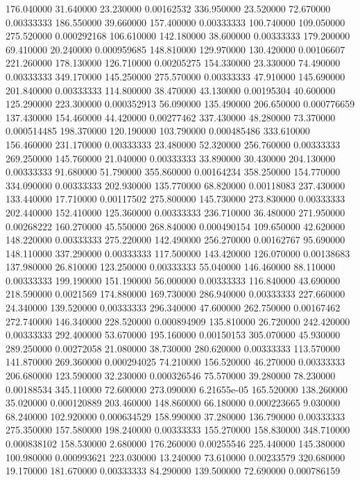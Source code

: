 176.040000	31.640000	23.230000	0.00162532
336.950000	23.520000	72.670000	0.00333333
186.550000	39.660000	157.400000	0.00333333
100.740000	109.050000	275.520000	0.000292168
106.610000	142.180000	38.600000	0.00333333
179.200000	69.410000	20.240000	0.000959685
148.810000	129.970000	130.420000	0.00106607
221.260000	178.130000	126.710000	0.00205275
154.330000	23.330000	74.490000	0.00333333
349.170000	145.250000	275.570000	0.00333333
47.910000	145.690000	201.840000	0.00333333
114.800000	38.470000	43.130000	0.00195304
40.600000	125.290000	223.300000	0.000352913
56.090000	135.490000	206.650000	0.000776659
137.430000	154.460000	44.420000	0.00277462
337.430000	48.280000	73.370000	0.000514485
198.370000	120.190000	103.790000	0.000485486
333.610000	156.460000	231.170000	0.00333333
23.480000	52.320000	256.760000	0.00333333
269.250000	145.760000	21.040000	0.00333333
33.890000	30.430000	204.130000	0.00333333
91.680000	51.790000	355.860000	0.00164234
358.250000	154.770000	334.090000	0.00333333
202.930000	135.770000	68.820000	0.00118083
237.430000	133.440000	17.710000	0.00117502
275.800000	145.730000	273.830000	0.00333333
202.440000	152.410000	125.360000	0.00333333
236.710000	36.480000	271.950000	0.00268222
160.270000	45.550000	268.840000	0.000490154
109.650000	42.620000	148.220000	0.00333333
275.220000	142.490000	256.270000	0.00162767
95.690000	148.110000	337.290000	0.00333333
117.500000	143.420000	126.070000	0.00138683
137.980000	26.810000	123.250000	0.00333333
55.040000	146.460000	88.110000	0.00333333
199.190000	151.190000	56.000000	0.00333333
116.840000	43.690000	218.590000	0.0021569
174.880000	169.730000	286.940000	0.00333333
227.660000	24.340000	139.520000	0.00333333
296.340000	47.600000	262.750000	0.00167462
272.740000	146.340000	228.520000	0.000894909
135.810000	26.720000	242.420000	0.00333333
292.400000	53.670000	195.160000	0.00150153
305.070000	45.930000	289.250000	0.00272058
21.080000	38.730000	280.620000	0.00333333
113.570000	141.870000	269.360000	0.000294025
74.210000	156.520000	46.270000	0.00333333
206.680000	123.590000	32.230000	0.000326546
75.570000	39.280000	78.230000	0.00188534
345.110000	72.600000	273.090000	6.21655e-05
165.520000	138.260000	35.020000	0.000120889
203.460000	148.860000	66.180000	0.000223665
9.030000	68.240000	102.920000	0.000634529
158.990000	37.280000	136.790000	0.00333333
275.350000	157.580000	198.240000	0.00333333
155.270000	158.830000	348.710000	0.000838102
158.530000	2.680000	176.260000	0.00255546
225.440000	145.380000	100.980000	0.000993621
223.030000	13.240000	73.610000	0.00233579
320.680000	19.170000	181.670000	0.00333333
84.290000	139.500000	72.690000	0.000786159
